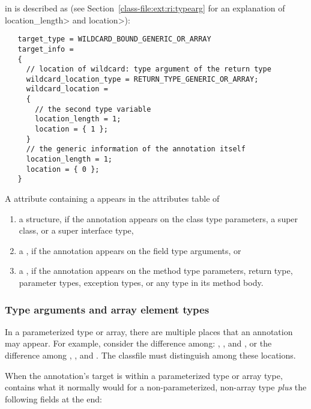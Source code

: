 \documentclass[10pt]{article}
\begin{document}
\noindent
{} in  is described as (see Section~\ref{class-file:ext:ri:typearg} for
an explanation of \<location\_length> and \<location>):

\begin{Verbatim}
   target_type = WILDCARD_BOUND_GENERIC_OR_ARRAY
   target_info =
   {
     // location of wildcard: type argument of the return type
     wildcard_location_type = RETURN_TYPE_GENERIC_OR_ARRAY;
     wildcard_location =
     {
       // the second type variable
       location_length = 1;
       location = { 1 };
     }
     // the generic information of the annotation itself
     location_length = 1;
     location = { 0 };
   }
\end{Verbatim}

A \RuntimeInOrVisibleTypeAnnotations attribute containing a
 appears in the attributes table of

\begin{enumerate}
\item
a  structure, if the annotation appears on the class
type parameters, a super class, or a super interface type,

\item
a , if the annotation appears on the field type
arguments, or

\item
a , if the annotation appears on the method type
parameters, return type, parameter types, exception types, or any type
in its method body.

\end{enumerate}

\subsubsection{Type arguments and array element types\label{class-file:ext:ri:typearg}}

In a parameterized type or array, there are multiple places that an
annotation may appear.  For example, consider the difference among:
,
, and
,
or the difference  among 
,
, and
.
The classfile must distinguish among these locations.

When the annotation's target is within a parameterized type or
array type,
 contains what it normally would for a
non-parameterized, non-array type
{\em plus} the following fields at the end:
\end{document}
